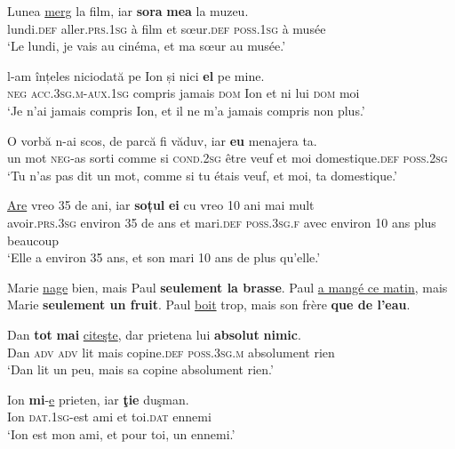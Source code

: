 \ea \label{ch2:ex134}
\ea 
\gll Lunea  \uline{merg}  la  film,  iar  \textbf{sora} \textbf{mea}  la  muzeu.\\
lundi.\textsc{def}  aller.\textsc{prs.1sg} à  film  et  sœur.\textsc{def} \textsc{poss.1sg}  à  musée\\ 
\glt  ‘Le lundi, je vais au cinéma, et ma sœur au musée.’  

\ex  
\gll {}  l-am  înțeles  niciodată  pe  Ion  și  nici  \textbf{el}  pe  mine.\\
\textsc{neg} \textsc{acc.3sg.m-aux.1sg}  compris  jamais  \textsc{dom}  Ion  et  ni  lui  \textsc{dom}  moi\\ 
\glt ‘Je n’ai jamais compris Ion, et il ne m’a jamais compris non plus.’

\ex  
\gll O  vorbă  n-ai  scos,  {de parcă}    fi  văduv,  iar  \textbf{eu}  menajera  ta.\\
un  mot  \textsc{neg-}as  sorti  {comme si}  \textsc{cond.2sg}  être veuf  et  moi  domestique.\textsc{def} \textsc{poss.2sg}\\
\glt  ‘Tu n’as pas dit un mot, comme si tu étais veuf, et moi, ta domestique.’ %

\ex  
\gll \uline{Are}  vreo  35  de  ani,  iar  \textbf{soțul} \textbf{ei}  cu  vreo  10  ani  mai mult\\ 
avoir.\textsc{prs.3sg} environ 35  de  ans  et  mari.\textsc{def}  \textsc{poss.3sg.f}  avec  environ  10  ans  plus beaucoup\\ 
\glt  ‘Elle a environ 35 ans, et son mari 10 ans de plus qu’elle.’ 
\z
\z


\ea \label{ch2:ex135}
\ea Marie \uline{nage} bien, mais Paul \textbf{seulement la brasse}.
\ex  Paul \uline{a mangé ce matin}, mais Marie \textbf{seulement un fruit}.
\ex  Paul \uline{boit} trop, mais son frère \textbf{que de l’eau}.
\z
\z

\ea
\ea 
\gll Dan  \textbf{tot}  \textbf{mai}  \uline{citeşte},  dar  prietena  lui  \textbf{absolut}  \textbf{nimic}. \label{ch2:ex136a}\\
Dan  \textsc{adv} \textsc{adv}  lit  mais  copine.\textsc{def} \textsc{poss.3sg.m}  absolument  rien\\ 
\glt  ‘Dan lit un peu, mais sa copine absolument rien.’  

\ex  
\gll Ion  \textbf{mi}-\uline{e}  prieten,  iar  \textbf{ţie}  duşman. \label{ch2:ex136b}\\
Ion  \textsc{dat.1sg}-est  ami  et  toi.\textsc{dat} ennemi\\ 
\glt  ‘Ion est mon ami, et pour toi, un ennemi.’ 
\z
\z

